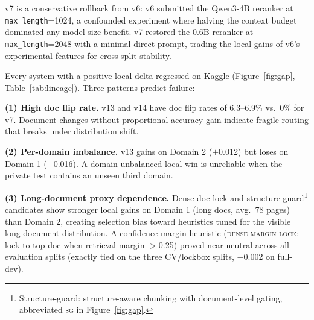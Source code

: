 \documentclass[11pt]{article}
\begin{document}
\begin{table}[t]
\centering
{}
\caption{Submission lineage. \textbf{v7} is the final best. All systems with positive local deltas regressed on Kaggle (Figure~\ref{fig:gap}).}
\label{tab:lineage}
\end{table}

v7 is a conservative rollback from v6: v6 submitted the Qwen3-4B reranker at \texttt{max\_length}=1024, a confounded experiment where halving the context budget dominated any model-size benefit. v7 restored the 0.6B reranker at \texttt{max\_length}=2048 with a minimal direct prompt, trading the local gains of v6's experimental features for cross-split stability.

Every system with a positive local delta regressed on Kaggle (Figure~\ref{fig:gap}, Table~\ref{tab:lineage}). Three patterns predict failure:

\textbf{(1) High doc flip rate.} v13 and v14 have doc flip rates of 6.3--6.9\% vs.\ 0\% for v7. Document changes without proportional accuracy gain indicate fragile routing that breaks under distribution shift.

\textbf{(2) Per-domain imbalance.} v13 gains on Domain 2 ($+$0.012) but loses on Domain 1 ($-$0.016). A domain-unbalanced local win is unreliable when the private test contains an unseen third domain.

\textbf{(3) Long-document proxy dependence.} Dense-doc-lock and structure-guard\footnote{Structure-guard: structure-aware chunking with document-level gating, abbreviated \textsc{sg} in Figure~\ref{fig:gap}.} candidates show stronger local gains on Domain 1 (long docs, avg.\ 78 pages) than Domain 2, creating selection bias toward heuristics tuned for the visible long-document distribution. A confidence-margin heuristic (\textsc{dense-margin-lock}: lock to top doc when retrieval margin $>$0.25) proved near-neutral across all evaluation splits (exactly tied on the three CV/lockbox splits, $-$0.002 on full-dev).
\end{document}
